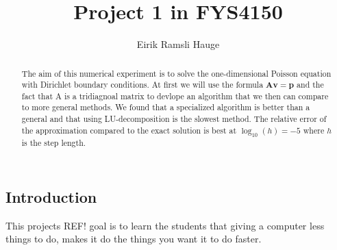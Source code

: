 \documentclass[12pt,a4paper]{article}
\author{Eirik Ramsli Hauge}
\title{Project 1 in FYS4150}
\newcommand{\V}[1]{\mathbf{#1}}
\newcommand{\husk}[1]{\color{red} #1 \color{black}}
\begin{document}
	\maketitle
	
\begin{abstract}
The aim of this numerical experiment is to solve the one-dimensional Poisson equation with Dirichlet boundary conditions. At first we will use the formula $\V{A} \V{v} = \V{p}$ and the fact that A is a tridiagnoal matrix to devlope an algorithm that we then can compare to more general methods. We found that a specialized algorithm is better than a general and that using LU-decomposition is the slowest method. The relative error of the approximation compared to the exact solution is best at $\log_{10}(h) = -5$ where $h$ is the step length.
\end{abstract}
\subsection*{Introduction}
This projects\husk{REF!} goal is to learn the students that giving a computer less things to do, makes it do the things you want it to do faster. 
\end{document}
